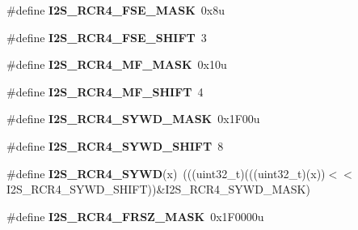 \begin{DoxyCompactItemize}
\item 
\#define {\bfseries I2\+S\+\_\+\+R\+C\+R4\+\_\+\+F\+S\+E\+\_\+\+M\+A\+SK}~0x8u\hypertarget{group__I2S__Register__Masks_ga9c6885d55f2de2dcd4649b15582dbd63}{}\label{group__I2S__Register__Masks_ga9c6885d55f2de2dcd4649b15582dbd63}

\item 
\#define {\bfseries I2\+S\+\_\+\+R\+C\+R4\+\_\+\+F\+S\+E\+\_\+\+S\+H\+I\+FT}~3\hypertarget{group__I2S__Register__Masks_ga37d794e272f05da947af5073c3340a6e}{}\label{group__I2S__Register__Masks_ga37d794e272f05da947af5073c3340a6e}

\item 
\#define {\bfseries I2\+S\+\_\+\+R\+C\+R4\+\_\+\+M\+F\+\_\+\+M\+A\+SK}~0x10u\hypertarget{group__I2S__Register__Masks_ga7256d017dda987fcd8ac9daae80208b7}{}\label{group__I2S__Register__Masks_ga7256d017dda987fcd8ac9daae80208b7}

\item 
\#define {\bfseries I2\+S\+\_\+\+R\+C\+R4\+\_\+\+M\+F\+\_\+\+S\+H\+I\+FT}~4\hypertarget{group__I2S__Register__Masks_gace2764bf30039c2f06ef202b86052ba4}{}\label{group__I2S__Register__Masks_gace2764bf30039c2f06ef202b86052ba4}

\item 
\#define {\bfseries I2\+S\+\_\+\+R\+C\+R4\+\_\+\+S\+Y\+W\+D\+\_\+\+M\+A\+SK}~0x1\+F00u\hypertarget{group__I2S__Register__Masks_ga1fb484ccadebeaab844b5dcfa0c89950}{}\label{group__I2S__Register__Masks_ga1fb484ccadebeaab844b5dcfa0c89950}

\item 
\#define {\bfseries I2\+S\+\_\+\+R\+C\+R4\+\_\+\+S\+Y\+W\+D\+\_\+\+S\+H\+I\+FT}~8\hypertarget{group__I2S__Register__Masks_ga5ad9893dd40464452393719f845ae58d}{}\label{group__I2S__Register__Masks_ga5ad9893dd40464452393719f845ae58d}

\item 
\#define {\bfseries I2\+S\+\_\+\+R\+C\+R4\+\_\+\+S\+Y\+WD}(x)~(((uint32\+\_\+t)(((uint32\+\_\+t)(x))$<$$<$I2\+S\+\_\+\+R\+C\+R4\+\_\+\+S\+Y\+W\+D\+\_\+\+S\+H\+I\+FT))\&I2\+S\+\_\+\+R\+C\+R4\+\_\+\+S\+Y\+W\+D\+\_\+\+M\+A\+SK)\hypertarget{group__I2S__Register__Masks_ga500886836a634bbb05fe4c03b091c2b9}{}\label{group__I2S__Register__Masks_ga500886836a634bbb05fe4c03b091c2b9}

\item 
\#define {\bfseries I2\+S\+\_\+\+R\+C\+R4\+\_\+\+F\+R\+S\+Z\+\_\+\+M\+A\+SK}~0x1\+F0000u\hypertarget{group__I2S__Register__Masks_ga8eda652c5a5ee719963f7103561bdc73}{}\label{group__I2S__Register__Masks_ga8eda652c5a5ee719963f7103561bdc73}


\end{DoxyCompactItemize}
